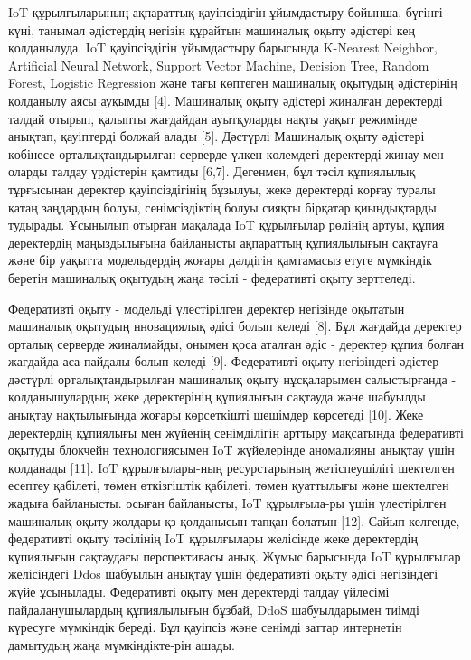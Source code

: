 \begin{multicols}{2}
IoT құрылғыларының ақпараттық қауіпсіздігін ұйымдастыру бойынша, бүгінгі
күні, танымал әдістердің негізін құрайтын машиналық оқыту әдістері кең
қолданылуда. IoT қауіпсіздігін ұйымдастыру барысында K-Nearest Neighbor,
Artificial Neural Network, Support Vector Machine, Decision Tree, Random
Forest, Logistic Regression және тағы көптеген машиналық оқытудың
әдістерінің қолданылу аясы ауқымды {[}4{]}. Машиналық оқыту әдістері
жиналған деректерді талдай отырып, қалыпты жағдайдан ауытқуларды нақты
уақыт режимінде анықтап, қауіптерді болжай алады {[}5{]}. Дәстүрлі
Машиналық оқыту әдістері көбінесе орталықтандырылған серверде үлкен
көлемдегі деректерді жинау мен оларды талдау үрдістерін қамтиды
{[}6,7{]}. Дегенмен, бұл тәсіл құпиялылық тұрғысынан деректер
қауіпсіздігінің бұзылуы, жеке деректерді қорғау туралы қатаң заңдардың
болуы, сенімсіздіктің болуы сияқты бірқатар қиындықтарды тудырады.
Ұсынылып отырған мақалада IoT құрылғылар рөлінің артуы, құпия
деректердің маңыздылығына байланысты ақпараттың құпиялылығын сақтауға
және бір уақытта модельдердің жоғары дәлдігін қамтамасыз етуге мүмкіндік
беретін машиналық оқытудың жаңа тәсілі - федеративті оқыту зерттеледі.

Федеративті оқыту - модельді үлестірілген деректер негізінде оқытатын
машиналық оқытудың нновациялық әдісі болып келеді {[}8{]}. Бұл жағдайда
деректер орталық серверде жиналмайды, онымен қоса аталған әдіс -
деректер құпия болған жағдайда аса пайдалы болып келеді {[}9{]}.
Федеративті оқыту негізіндегі әдістер дәстүрлі орталықтандырылған
машиналық оқыту нұсқаларымен салыстырғанда - қолданышулардың жеке
деректерінің құпиялығын сақтауда және шабуылды анықтау нақтылығында
жоғары көрсеткішті шешімдер көрсетеді {[}10{]}. Жеке деректердің
құпиялығы мен жүйенің сенімділігін арттыру мақсатында федеративті
оқытуды блокчейн технологиясымен IoT жүйелерінде аномалияны анықтау үшін
қолданады {[}11{]}. IoT құрылғылары-ның ресурстарының жетіспеушілігі
шектелген есептеу қабілеті, төмен өткізгіштік қабілеті, төмен қуаттылығы
және шектелген жадыға байланысты. осыған байланысты, IoT құрылғыла-ры
үшін үлестірілген машиналық оқыту жолдары қз қолданысын тапқан болатын
{[}12{]}. Сайып келгенде, федеративті оқыту тәсілінің IoT құрылғылары
желісінде жеке деректердің құпиялығын сақтаудағы перспективасы анық.
Жұмыс барысында IoT құрылғылар желісіндегі Ddos шабуылын анықтау үшін
федеративті оқыту әдісі негізіндегі жүйе ұсынылады. Федеративті оқыту
мен деректерді талдау үйлесімі пайдаланушылардың құпиялылығын бұзбай,
DdoS шабуылдарымен тиімді күресуге мүмкіндік береді. Бұл қауіпсіз және
сенімді заттар интернетін дамытудың жаңа мүмкіндікте-рін ашады.


\end{multicols}
